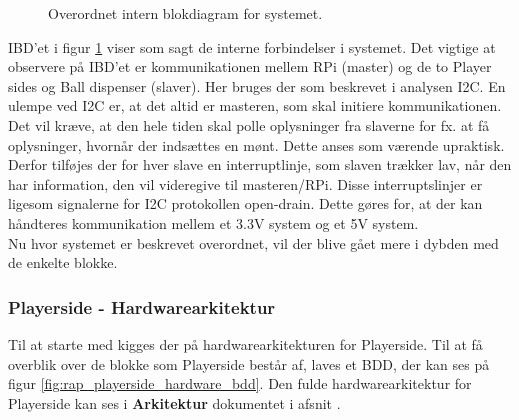 \documentclass[Rapport/Rapport_main.tex]{subfiles}
\begin{document}
\begin{figure}[H]
    \centering
    \caption{Overordnet intern blokdiagram for systemet.}
    \label{fig:rap_overall_hardware_ibd}
\end{figure}
IBD'et i figur \ref{fig:rap_overall_hardware_ibd} viser som sagt de interne forbindelser i systemet. Det vigtige at observere på IBD'et er kommunikationen mellem RPi (master) og de to Player sides og Ball dispenser (slaver). Her bruges der som beskrevet i analysen  I2C. En ulempe ved I2C er, at det altid er masteren, som skal initiere kommunikationen. Det vil kræve, at den hele tiden skal polle oplysninger fra slaverne for fx. at få oplysninger, hvornår der indsættes en mønt. Dette anses som værende upraktisk. Derfor tilføjes der for hver slave en interruptlinje,  som slaven trækker lav, når den har information, den vil videregive til masteren/RPi. Disse interruptslinjer er ligesom signalerne for I2C protokollen open-drain. Dette gøres for, at der kan håndteres kommunikation mellem et 3.3V system og et 5V system.\\
Nu hvor systemet er beskrevet overordnet, vil der blive gået mere i dybden med de enkelte blokke.
\subsubsection{Playerside - Hardwarearkitektur}
Til at starte med kigges der på hardwarearkitekturen for Playerside. Til at få overblik over de blokke som Playerside består af, laves et BDD, der kan ses på figur \ref{fig:rap_playerside_hardware_bdd}. Den fulde hardwarearkitektur for Playerside kan ses i \textbf{Arkitektur} dokumentet i afsnit .
\end{document}
